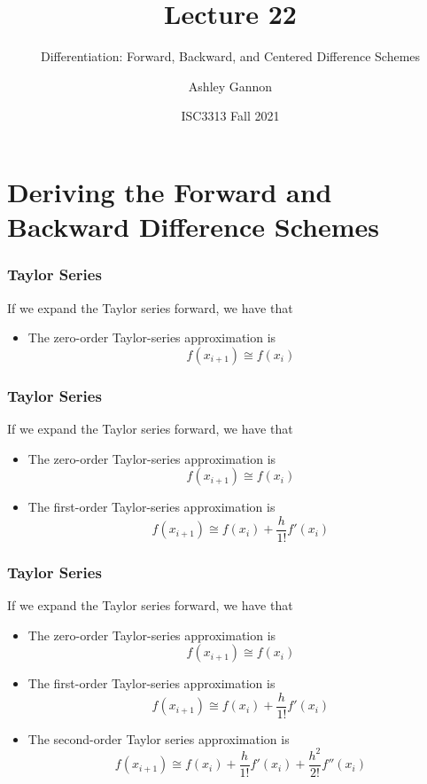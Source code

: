 \documentclass{if-beamer}
\title[Lecture 22]{Lecture 22}
\subtitle{Differentiation: Forward, Backward, and Centered Difference Schemes}
\author{Ashley Gannon}
\date{ISC3313 Fall 2021}
\begin{document}
\begin{frame}
  \titlepage
\end{frame}
\section{Deriving the Forward and Backward Difference Schemes}

\begin{frame}[t]
\frametitle{Taylor Series}

	If we expand the Taylor series forward, we have that 
	\begin{itemize}
		\item 	The zero-order Taylor-series approximation is
		$$f(x_{i+1}) \cong f(x_i) $$

	\end{itemize}	
\end{frame}


\begin{frame}[t]
\frametitle{Taylor Series}

If we expand the Taylor series forward, we have that 
\begin{itemize}
	\item 	The zero-order Taylor-series approximation is
	$$f(x_{i+1}) \cong f(x_i) $$
	\item The first-order Taylor-series approximation is
	$$f(x_{i+1}) \cong f(x_i) +\frac{h}{1!}f'(x_i) $$
\end{itemize}	
\end{frame}


\begin{frame}[t]
\frametitle{Taylor Series}

If we expand the Taylor series forward, we have that 
\begin{itemize}
	\item 	The zero-order Taylor-series approximation is
	$$f(x_{i+1}) \cong f(x_i) $$
	\item The first-order Taylor-series approximation is
	$$f(x_{i+1}) \cong f(x_i) +\frac{h}{1!}f'(x_i) $$
	\item The second-order Taylor series approximation is 
	$$f(x_{i+1}) \cong f(x_i) +\frac{h}{1!}f'(x_i) + \frac{h^2}{2!}f''(x_i)$$
\end{itemize}	
\end{frame}
\end{document}
